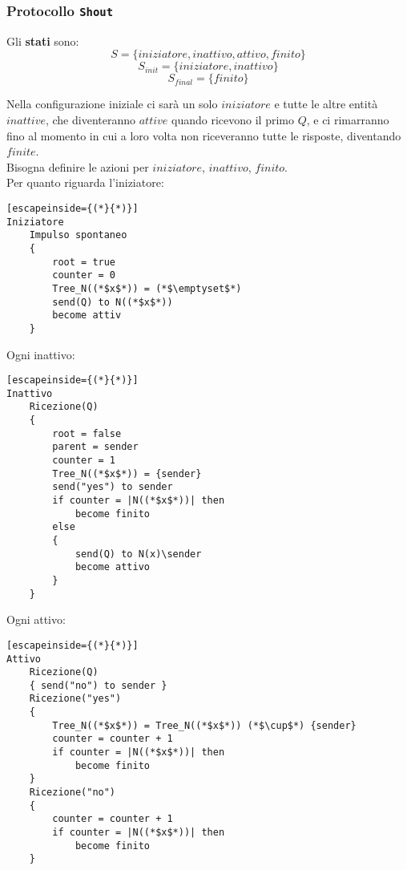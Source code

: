 \newpage

\subsubsection{Protocollo \texttt{Shout}}
Gli \textbf{stati} sono:
$$ S = \{iniziatore, inattivo, attivo, finito \} $$
$$ S_{init} = \{iniziatore, inattivo \} $$
$$ S_{final} = \{finito\} $$

Nella configurazione iniziale ci sarà un solo $iniziatore$ e tutte le altre entità $inattive$, che diventeranno $attive$ quando ricevono il primo $Q$, e ci rimarranno fino al momento in cui a loro volta non riceveranno tutte le risposte, diventando $finite$.\\

Bisogna definire le azioni per $iniziatore$, $inattivo$, $finito$.\\

Per quanto riguarda l'iniziatore:
\begin{lstlisting}[escapeinside={(*}{*)}]
Iniziatore
	Impulso spontaneo
	{
		root = true
		counter = 0 
		Tree_N((*$x$*)) = (*$\emptyset$*)
		send(Q) to N((*$x$*))
		become attiv
	}
\end{lstlisting}

\newpage

Ogni inattivo:
\begin{lstlisting}[escapeinside={(*}{*)}]
Inattivo 
	Ricezione(Q)
	{
		root = false
		parent = sender 
		counter = 1
		Tree_N((*$x$*)) = {sender}
		send("yes") to sender
		if counter = |N((*$x$*))| then 
			become finito
		else 
		{
			send(Q) to N(x)\sender
			become attivo
		}
	}
\end{lstlisting}

Ogni attivo:
\begin{lstlisting}[escapeinside={(*}{*)}]
Attivo
	Ricezione(Q)
	{ send("no") to sender }
	Ricezione("yes")
	{
		Tree_N((*$x$*)) = Tree_N((*$x$*)) (*$\cup$*) {sender}
		counter = counter + 1
		if counter = |N((*$x$*))| then 
			become finito
	}
	Ricezione("no")
	{
		counter = counter + 1
		if counter = |N((*$x$*))| then 
			become finito
	}
\end{lstlisting}

\newpage


